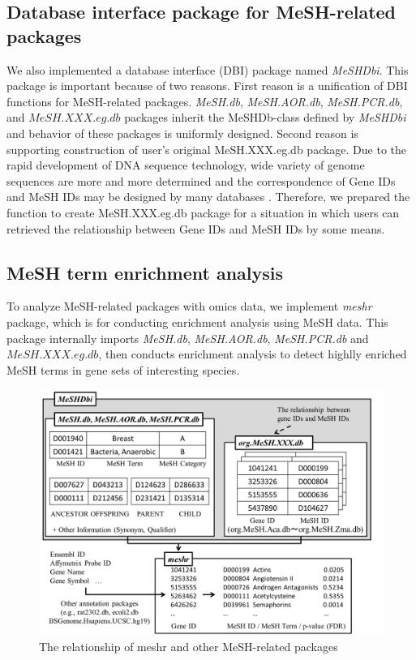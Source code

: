 \documentclass[11pt]{article}
\newcommand{\Rpackage}[1]{{\textit{#1}}}
\begin{document}
\subsection{Database interface package for MeSH-related packages}
We also implemented a database interface (DBI) package named \Rpackage{MeSHDbi}. This package is important because of two reasons. First reason is a unification of DBI functions for MeSH-related packages. \Rpackage{MeSH.db}, \Rpackage{MeSH.AOR.db}, \Rpackage{MeSH.PCR.db}, and $MeSH.XXX.eg.db$ packages inherit the MeSHDb-class defined by \Rpackage{MeSHDbi} and behavior of these packages is uniformly designed. Second reason is supporting construction of user's original MeSH.XXX.eg.db package. Due to the rapid development of DNA sequence technology, wide variety of genome sequences are more and more determined and the correspondence of Gene IDs and MeSH IDs may be designed by many databases \cite{Nakazato2007, Nakazato2009, Saurin2010, Sartor2012}. Therefore, we prepared the function to create MeSH.XXX.eg.db package for a situation in which users can retrieved the relationship between Gene IDs and MeSH IDs by some means.

\subsection{MeSH term enrichment analysis}
To analyze MeSH-related packages with omics data, we implement \Rpackage{meshr} package, which is for conducting enrichment analysis using MeSH data. This package internally imports \Rpackage{MeSH.db}, \Rpackage{MeSH.AOR.db}, \Rpackage{MeSH.PCR.db} and $MeSH.XXX.eg.db$, then conducts enrichment analysis to detect highlly enriched MeSH terms in gene sets of interesting species.
\begin{figure}[ht]
\centering
\includegraphics[width=\linewidth]{fig4.png}
\caption{The relationship of meshr and other MeSH-related packages}
\label{fig4}
\end{figure}
\clearpage
\end{document}
